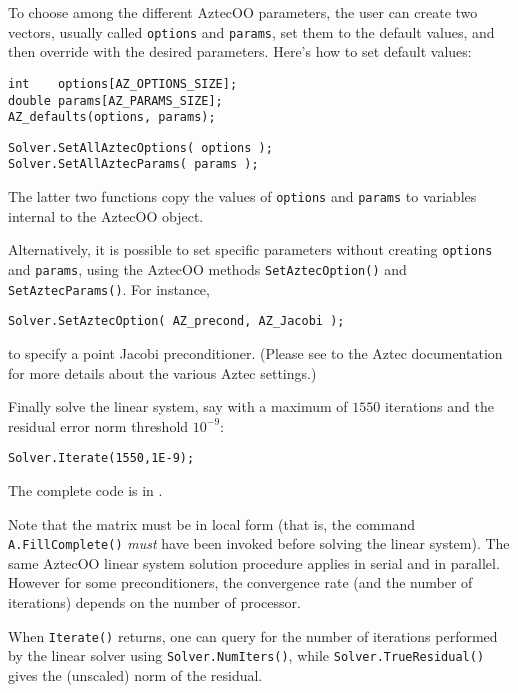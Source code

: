 To choose among the different AztecOO parameters, the user can create
two vectors, usually called \verb!options! and \verb!params!, set them
to the default values, and then override with the desired parameters.
Here's how to set default values: 
\begin{verbatim}
int    options[AZ_OPTIONS_SIZE];
double params[AZ_PARAMS_SIZE];
AZ_defaults(options, params);
\end{verbatim}
\begin{verbatim}
Solver.SetAllAztecOptions( options );
Solver.SetAllAztecParams( params );
\end{verbatim}
The latter two functions copy the values of \verb!options! and
\verb!params! 
to variables internal to the AztecOO object.

Alternatively, it is possible to set specific parameters without
creating \verb!options! and \verb!params!, using the AztecOO methods
\verb!SetAztecOption()! and \verb!SetAztecParams()!. 
For instance,
\begin{verbatim}
Solver.SetAztecOption( AZ_precond, AZ_Jacobi );
\end{verbatim}
to specify a point Jacobi preconditioner.  (Please see to the Aztec
documentation \cite{AztecOO-Users-Guide} for more details about the various Aztec settings.)

Finally solve the linear system, say with a maximum of $1550$ iterations and
the residual error norm threshold $10^{-9}$:
\begin{verbatim}
Solver.Iterate(1550,1E-9);
\end{verbatim}
The complete code is in .

Note that the matrix must be in local form (that is, the command
\verb!A.FillComplete()! {\em must} have been invoked before solving the
linear system).  The same AztecOO linear system solution procedure 
applies in serial and in parallel.  However for some preconditioners,
the convergence rate (and the number of iterations) 
depends on the number of processor.

When \verb!Iterate()! returns, one can query for the number of
iterations performed by the linear solver using
\verb!Solver.NumIters()!, while \verb!Solver.TrueResidual()! gives the
(unscaled) norm of the residual.

